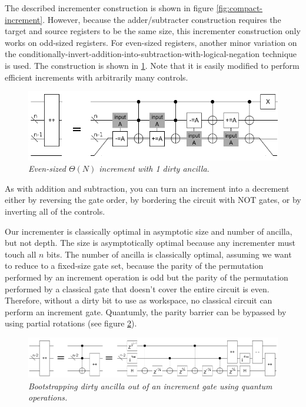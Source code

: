 \documentclass[twocolumn]{article}
\begin{document}
The described incrementer construction is shown in figure \ref{fig:compact-increment}.
However, because the adder/subtracter construction requires the target and source registers to be the same size, this incrementer construction only works on odd-sized registers.
For even-sized registers, another minor variation on the conditionally-invert-addition-into-subtraction-with-logical-negation technique is used.
The construction is shown in \ref{fig:compact-increment-even}.
Note that it is easily modified to perform efficient increments with arbitrarily many controls.

\begin{figure}
  \centering
  \includegraphics[totalheight=2cm]{compact-increment-even.png}
  \caption{\em Even-sized $\Theta(N)$ increment with 1 dirty ancilla.}
  \label{fig:compact-increment-even}
\end{figure}

As with addition and subtraction, you can turn an increment into a decrement either by reversing the gate order, by bordering the circuit with NOT gates, or by inverting all of the controls.

Our incrementer is classically optimal in asymptotic size and number of ancilla, but not depth.
The size is asymptotically optimal because any incrementer must touch all $n$ bits.
The number of ancilla is classically optimal, assuming we want to reduce to a fixed-size gate set, because the parity of the permutation performed by an increment operation is odd but the parity of the permutation performed by a classical gate that doesn't cover the entire circuit is even.
Therefore, without a dirty bit to use as workspace, no classical circuit can perform an increment gate.
Quantumly, the parity barrier can be bypassed by using partial rotations (see figure \ref{fig:bootstrap-ancilla}).

\begin{figure}
  \centering
  \includegraphics[totalheight=1.3cm]{ancilla-bootstrap.png}
  \caption{\em Bootstrapping dirty ancilla out of an increment gate using quantum operations.}
  \label{fig:bootstrap-ancilla}
\end{figure}
\end{document}
